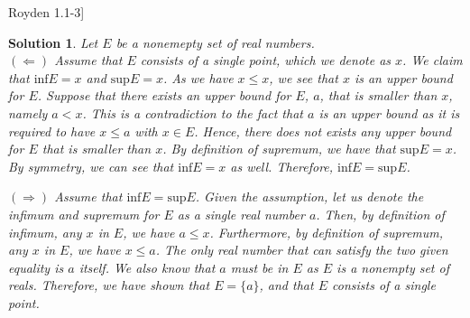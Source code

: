\documentclass{article} %
\def\Qb#1\Qe{\begin{question}#1\end{question}}
\theoremstyle{quest}
\newtheorem*{question}{Question}
\newtheorem*{solution}{Solution}
\begin{document}
\bigskip

\Qb[Royden 1.1-3]
\Qe
\begin{solution}
Let $E$ be a nonemepty set of real numbers.\\ 
$\mathbf{( \Leftarrow )}$ Assume that 
$E$ consists of a single point, which we denote as $x$. We claim that
$\text{inf}E = x$ and $\text{sup}E = x$. As we have $x \leq x$, we see that $x$ is an upper bound
for $E$. Suppose that there exists an upper bound for $E$, $a$, that is smaller than $x$, namely 
$a < x$. This is a contradiction to the fact that $a$ is an upper bound as it is required to have
$x \leq a$ with $x \in E$. Hence, there does not exists any upper bound for $E$ that is smaller than
$x$. By definition of supremum, we have that $\text{sup}E = x$. By symmetry, we can see that
$\text{inf}E = x$ as well. Therefore, $\text{inf}E = \text{sup}E$. \\ 

\smallskip

$\mathbf{( \Rightarrow )}$ Assume that $\text{inf} E = \text{sup} E$. 
Given the assumption, let us denote the infimum and supremum for $E$ as a
single real number $a$. Then, by definition of infimum, any $x$ in $E$, we have
$a \leq x$. Furthermore, by definition of supremum, any $x$ in $E$, we have $x \leq a$.
The only real number that can satisfy the two given equality is $a$ itself. We also know
that $a$ must be in $E$ as $E$ is a nonempty set of reals. Therefore, 
we have shown that $E = \{ a \}$, and that $E$ consists of a single point.
\end{solution}

\bigskip
\end{document}
